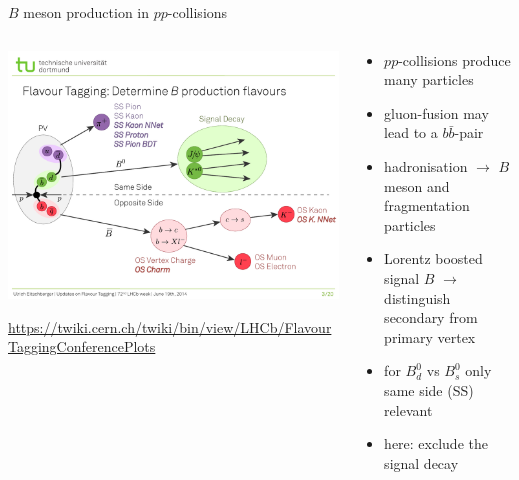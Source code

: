 \documentclass[aspectratio=1610, 10pt]{beamer}
\begin{document}
\begin{frame}{$B$ meson production in $pp$-collisions}
  \begin{columns}
    \begin{column}{0.6\textwidth}
      \centering
      \includegraphics[width=\textwidth]{images/FlavourTaggingScheme.pdf}

      \tiny \url{https://twiki.cern.ch/twiki/bin/view/LHCb/FlavourTaggingConferencePlots}
    \end{column}
    \begin{column}{0.4\textwidth}
      \begin{itemize}
        \item $pp$-collisions produce many particles
        \item gluon-fusion may lead to a $b\bar{b}$-pair
        \item hadronisation $\rightarrow$ $B$ meson and fragmentation particles
        \item Lorentz boosted signal $B$ $\rightarrow$ distinguish secondary from primary vertex
        \item for $B^0_d$ vs $B^0_s$ only same side (SS) relevant
        \item here: exclude the signal decay
      \end{itemize}
    \end{column}
  \end{columns}
\end{frame}
\end{document}
